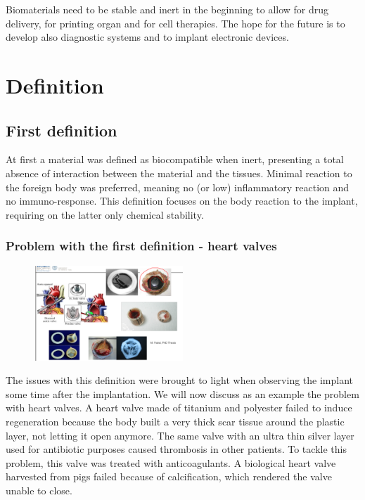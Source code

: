 	Biomaterials need to be stable and inert in the beginning to allow for drug delivery, for printing organ and for cell therapies.
	The hope for the future is to develop also diagnostic systems and to implant electronic devices.

\section{Definition}

	\subsection{First definition}
	At first a material was defined as biocompatible when inert, presenting a total absence of interaction between the material and the tissues.
	Minimal reaction to the foreign body was preferred, meaning no (or low) inflammatory reaction and no immuno-response.
	This definition focuses on the body reaction to the implant, requiring on the latter only chemical stability.

		\subsubsection{Problem with the first definition - heart valves}

		\begin{figure}[ht]
			\centering
			\includegraphics[width=0.5\textwidth]{valves.png}
			\caption{\label{fig:valves}}
		\end{figure}

		The issues with this definition were brought to light when observing the implant some time after the implantation.
		We will now discuss as an example the problem with heart valves.
		A heart valve made of titanium and polyester failed to induce regeneration because the body built a very thick scar tissue around the plastic layer, not letting it open anymore.
		The same valve with an ultra thin silver layer used for antibiotic purposes caused thrombosis in other patients.
		To tackle this problem, this valve was treated with anticoagulants.
		A biological heart valve harvested from pigs failed because of calcification, which rendered the valve unable to close.

